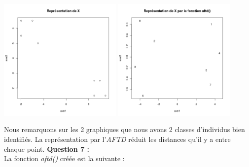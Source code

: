 \documentclass[a4paper, 10pt]{article}
\begin{document}
\begin{center}
\includegraphics[height = 6cm, width = 6cm]{plots/plot_exo1.png}
\includegraphics[height = 6cm, width = 6cm]{plots/plot_exo1_aftd.png}
\end{center}
Nous remarquons sur les 2 graphiques que nous avons 2 classes d'individus bien identifiés.
La représentation par l'\textit{AFTD} réduit les distances qu'il y a entre chaque point.
\newpage
\noindent
\textbf{Question 7 :}\\
La fonction \textit{aftd()} créée est la suivante :
\end{document}
